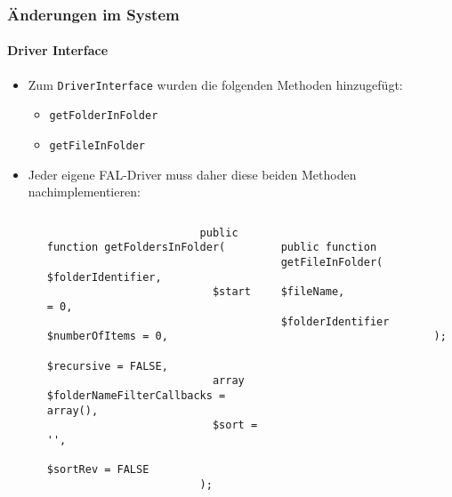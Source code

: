 \begin{frame}[fragile]
	\frametitle{Änderungen im System}
	\framesubtitle{Driver Interface}

	\lstset{basicstyle=\tiny\ttfamily}

	\begin{itemize}

		\item Zum \texttt{DriverInterface} wurden die folgenden Methoden hinzugefügt:

			\begin{itemize}
				\item \texttt{getFolderInFolder}
				\item \texttt{getFileInFolder}
			\end{itemize}

		\item Jeder eigene FAL-Driver muss daher diese beiden Methoden nachimplementieren:

			\begin{columns}[T]
				\begin{column}{.07\textwidth}
                \end{column}
				\begin{column}{.465\textwidth}

					\begin{lstlisting}
						public function getFoldersInFolder(
						  $folderIdentifier,
						  $start = 0,
						  $numberOfItems = 0,
						  $recursive = FALSE,
						  array $folderNameFilterCallbacks = array(),
						  $sort = '',
						  $sortRev = FALSE
						);
					\end{lstlisting}

                \end{column}
				\begin{column}{.465\textwidth}

					\begin{lstlisting}
						public function getFileInFolder(
						  $fileName,
						  $folderIdentifier
						);
					\end{lstlisting}

				\end{column}
			\end{columns}

	\end{itemize}

	\breakingchange

\end{frame}

